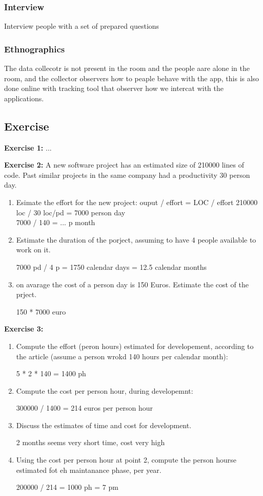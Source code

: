\documentclass[12pt]{article}
\begin{document}
\subsubsection{Interview}
Interview people with a set of prepared questions

\subsubsection{Ethnographics}
The data collecotr is not present in the room and the people aare alone in the room, and the collector observers how to peaple behave with the app, this is also done online with tracking tool that observer how we intercat with the applications.


\subsection{Exercise}
\textbf{Exercise 1:}
...

\textbf{Exercise 2:}
A new software project has an estimated size of 210000 lines of code. Past similar projects in the same company had a productivity 30 person day.
\begin{enumerate}
  \item Esimate the effort for the new project: ouput / effort = LOC / effort
    210000 loc / 30 loc/pd = 7000 person day \\
    7000 / 140 = ... p month
  \item Estimate the duration of the porject, assuming to have 4 people available to work on it.

    7000 pd / 4 p =  1750 calendar days = 12.5 calendar months
  \item on avarage the cost of a person day is 150 Euros. Estimate the cost of the prject.

    150 * 7000 euro
\end{enumerate}

\textbf{Exercise 3:}
\begin{enumerate}
  \item Compute the effort (peron hours) estimated for developement, according to the article (assume a person wrokd 140 hours per calendar month):

    5 * 2 * 140 = 1400 ph
  \item Compute the cost per person hour, during developemnt:

    300000 / 1400 = 214 euros per person hour
  \item Discuss the estimates of time and cost for development.

    2 months seems very short time, cost very high
  \item Using the cost per person hour at point 2, compute the person hourse estimated fot eh maintanance phase, per year.

    200000 / 214 = 1000 ph = 7 pm
\end{enumerate}
\end{document}
